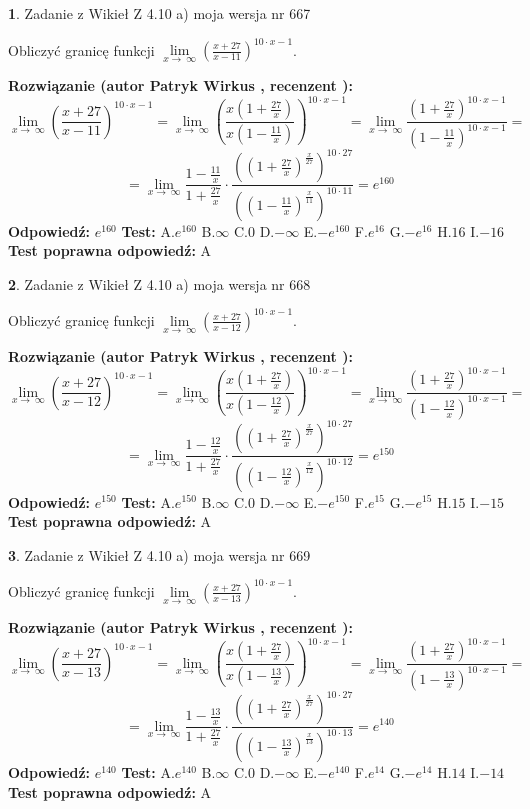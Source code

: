 \documentclass[12pt, a4paper]{article}
\theoremstyle{definition} %
\newtheorem{zad}{}
\newcommand{\zadStart}[1]{\begin{zad}#1\newline}
\newcommand{\zadStop}{\end{zad}}
\newcommand{\rozwStart}[2]{\noindent \textbf{Rozwiązanie (autor #1 , recenzent #2): }\newline}
\newcommand{\rozwStop}{\newline}
\newcommand{\odpStart}{\noindent \textbf{Odpowiedź:}\newline}
\newcommand{\odpStop}{\newline}
\newcommand{\testStart}{\noindent \textbf{Test:}\newline}
\newcommand{\testStop}{\newline}
\newcommand{\kluczStart}{\noindent \textbf{Test poprawna odpowiedź:}\newline}
\newcommand{\kluczStop}{\newline}
\begin{document}
\zadStart{Zadanie z Wikieł Z 4.10 a) moja wersja nr 667}

Obliczyć granicę funkcji  $\lim\limits_{x\to\ \infty}(\frac{x+27}{x-11})^{10\cdot x-1}$.
\zadStop
\rozwStart{Patryk Wirkus}{}
$$\lim\limits_{x\to\ \infty}(\frac{x+27}{x-11})^{10\cdot x-1} = \lim\limits_{x\to\ \infty}(\frac{x(1+\frac{27}{x})}{x(1-\frac{11}{x})})^{10\cdot x-1}=\lim\limits_{x\to\ \infty}\frac{(1+\frac{27}{x})^{10\cdot x-1}}{(1-\frac{11}{x})^{10\cdot x-1}}=$$
$$=\lim\limits_{x\to\ \infty}\frac{1-\frac{11}{x}}{1+\frac{27}{x}}\cdot\frac{((1+\frac{27}{x})^{\frac{x}{27}})^{10\cdot27}}{((1-\frac{11}{x})^{\frac{x}{11}})^{10\cdot11}}=e^{160}$$
\rozwStop
\odpStart
$e^{160}$
\odpStop
\testStart
A.$e^{160}$ B.$\infty$ C.$0$ D.$-\infty$ E.$-e^{160}$
F.$e^{16}$ G.$-e^{16}$
H.$16$
I.$-16$
\testStop
\kluczStart
A
\kluczStop



\zadStart{Zadanie z Wikieł Z 4.10 a) moja wersja nr 668}

Obliczyć granicę funkcji  $\lim\limits_{x\to\ \infty}(\frac{x+27}{x-12})^{10\cdot x-1}$.
\zadStop
\rozwStart{Patryk Wirkus}{}
$$\lim\limits_{x\to\ \infty}(\frac{x+27}{x-12})^{10\cdot x-1} = \lim\limits_{x\to\ \infty}(\frac{x(1+\frac{27}{x})}{x(1-\frac{12}{x})})^{10\cdot x-1}=\lim\limits_{x\to\ \infty}\frac{(1+\frac{27}{x})^{10\cdot x-1}}{(1-\frac{12}{x})^{10\cdot x-1}}=$$
$$=\lim\limits_{x\to\ \infty}\frac{1-\frac{12}{x}}{1+\frac{27}{x}}\cdot\frac{((1+\frac{27}{x})^{\frac{x}{27}})^{10\cdot27}}{((1-\frac{12}{x})^{\frac{x}{12}})^{10\cdot12}}=e^{150}$$
\rozwStop
\odpStart
$e^{150}$
\odpStop
\testStart
A.$e^{150}$ B.$\infty$ C.$0$ D.$-\infty$ E.$-e^{150}$
F.$e^{15}$ G.$-e^{15}$
H.$15$
I.$-15$
\testStop
\kluczStart
A
\kluczStop



\zadStart{Zadanie z Wikieł Z 4.10 a) moja wersja nr 669}

Obliczyć granicę funkcji  $\lim\limits_{x\to\ \infty}(\frac{x+27}{x-13})^{10\cdot x-1}$.
\zadStop
\rozwStart{Patryk Wirkus}{}
$$\lim\limits_{x\to\ \infty}(\frac{x+27}{x-13})^{10\cdot x-1} = \lim\limits_{x\to\ \infty}(\frac{x(1+\frac{27}{x})}{x(1-\frac{13}{x})})^{10\cdot x-1}=\lim\limits_{x\to\ \infty}\frac{(1+\frac{27}{x})^{10\cdot x-1}}{(1-\frac{13}{x})^{10\cdot x-1}}=$$
$$=\lim\limits_{x\to\ \infty}\frac{1-\frac{13}{x}}{1+\frac{27}{x}}\cdot\frac{((1+\frac{27}{x})^{\frac{x}{27}})^{10\cdot27}}{((1-\frac{13}{x})^{\frac{x}{13}})^{10\cdot13}}=e^{140}$$
\rozwStop
\odpStart
$e^{140}$
\odpStop
\testStart
A.$e^{140}$ B.$\infty$ C.$0$ D.$-\infty$ E.$-e^{140}$
F.$e^{14}$ G.$-e^{14}$
H.$14$
I.$-14$
\testStop
\kluczStart
A
\kluczStop
\end{document}
